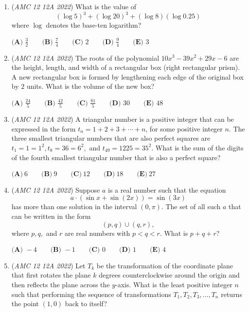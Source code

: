 \begin{enumerate}
	\item (\textit{AMC 12 12A 2022}) What is the value of 
 \[(\log 5)^3+(\log 20)^3+(\log 8)(\log 0.25)\] where $\log$ denotes the base-ten logarithm?


 $\textbf{(A) } \frac{3}{2} \qquad \textbf{(B) } \frac{7}{4} \qquad \textbf{(C) } 2 \qquad \textbf{(D) } \frac{9}{4} \qquad \textbf{(E) } 3$


	\item (\textit{AMC 12 12A 2022}) The roots of the polynomial $10x^3-39x^2+29x-6$ are the height, length, and width of a rectangular box (right rectangular prism). A new rectangular box is formed by lengthening each edge of the original box by $2$ units. What is the volume of the new box?


 $\textbf{(A) } \frac{24}{5} \qquad \textbf{(B) } \frac{42}{5} \qquad \textbf{(C) } \frac{81}{5} \qquad \textbf{(D) } 30 \qquad \textbf{(E) } 48$


	\item (\textit{AMC 12 12A 2022}) A triangular number is a positive integer that can be expressed in the form $t_n=1+2+3+\cdots+n$, for some positive integer $n$. The three smallest triangular numbers that are also perfect squares are $t_1=1=1^2, t_8=36=6^2,$ and $t_{49}=1225=35^2$. What is the sum of the digits of the fourth smallest triangular number that is also a perfect square?


 $\textbf{(A)} ~6 \qquad\textbf{(B)} ~9 \qquad\textbf{(C)} ~12 \qquad\textbf{(D)} ~18 \qquad\textbf{(E)} ~27$


	\item (\textit{AMC 12 12A 2022}) Suppose $a$ is a real number such that the equation 
 \[a\cdot(\sin{x}+\sin{(2x)}) = \sin{(3x)}\]
has more than one solution in the interval $(0, \pi)$. The set of all such $a$ that can be written
in the form 
 \[(p,q) \cup (q,r),\]
where $p, q,$ and $r$ are real numbers with $p < q< r$. What is $p+q+r$?


 $\textbf{(A) } {-}4 \qquad \textbf{(B) } {-}1 \qquad \textbf{(C) } 0 \qquad \textbf{(D) } 1 \qquad \textbf{(E) } 4$


	\item (\textit{AMC 12 12A 2022}) Let $T_k$ be the transformation of the coordinate plane that first rotates the plane $k$ degrees counterclockwise around the origin and then reflects the plane across the $y$-axis. What is the least positive integer $n$ such that performing the sequence of transformations $T_1, T_2, T_3, \dots, T_n$ returns the point $(1,0)$ back to itself?



\end{enumerate}
